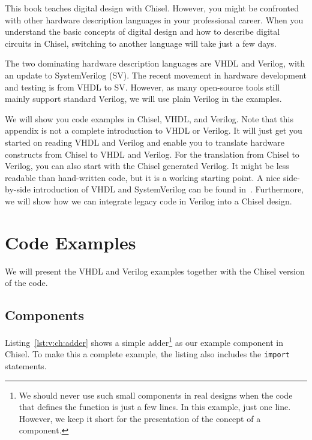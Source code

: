 \documentclass[%
    10pt,
    headinclude, footexclude,
    openright, %
    notitlepage,
    cleardoubleempty,
    headsepline,
    pointlessnumbers,
    bibtotoc, idxtotoc,
    ]{scrbook}
\newcommand{\code}[1]{{\lstinline[basicstyle=\small\ttfamily]{#1}}}
\begin{document}

This book teaches digital design with Chisel.
However, you might be confronted with other hardware
description languages in your professional career.
When you understand the basic concepts of digital design
and how to describe digital circuits in Chisel,
switching to another language will take just a few days.

The two dominating hardware description languages are
VHDL and Verilog, with an update to SystemVerilog (SV).
The recent movement in hardware development and testing is from VHDL to SV.
However, as many open-source tools still mainly support standard Verilog,
we will use plain Verilog in the examples.

We will show you code examples in Chisel, VHDL, and Verilog.
Note that this appendix is not a complete introduction to VHDL or Verilog.
It will just get you started on reading VHDL and Verilog and
enable you to translate hardware constructs from Chisel to VHDL and Verilog.
For the translation from Chisel to Verilog, you can also start with the Chisel
generated Verilog. It might be less readable than hand-written code, but it is a working
starting point.
A nice side-by-side introduction of VHDL and SystemVerilog can be found in~\cite{harris2021digital}.
Furthermore, we will show how we can integrate legacy code in Verilog into a Chisel design.

\section{Code Examples}


We will present the VHDL and Verilog examples together with the Chisel version
of the code.

\subsection{Components}



Listing~\ref{lst:v:ch:adder} shows a simple adder\footnote{We should never use
such small components in real designs when the code that defines the function is just a few lines.
In this example, just one line. However, we keep it short for the presentation
of the concept of a component.}
as our example component in Chisel.
To make this a complete example, the listing also includes the \code{import} statements.
\end{document}
